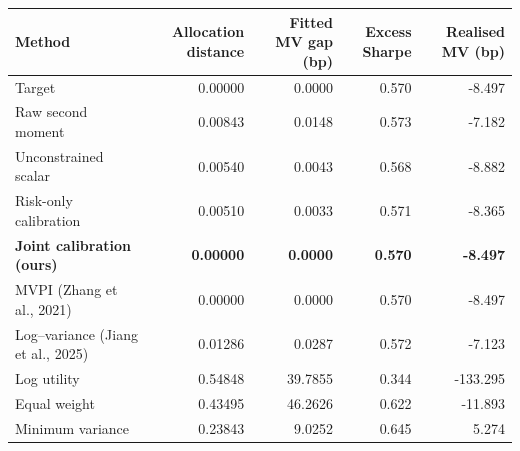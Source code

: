 \begin{tabular}{lrrrr}\toprule
Method & Allocation distance & Fitted MV gap (bp) & Excess Sharpe & Realised MV (bp)\\\midrule
Target & 0.00000 & 0.0000 & 0.570 & -8.497 \\
Raw second moment & 0.00843 & 0.0148 & 0.573 & -7.182 \\
Unconstrained scalar & 0.00540 & 0.0043 & 0.568 & -8.882 \\
Risk-only calibration & 0.00510 & 0.0033 & 0.571 & -8.365 \\
\textbf{Joint calibration (ours)} & \textbf{0.00000} & \textbf{0.0000} & \textbf{0.570} & \textbf{-8.497} \\
MVPI (Zhang et al., 2021)~\cite{zhang2021} & 0.00000 & 0.0000 & 0.570 & -8.497 \\
Log--variance (Jiang et al., 2025)~\cite{jiang2025} & 0.01286 & 0.0287 & 0.572 & -7.123 \\
Log utility & 0.54848 & 39.7855 & 0.344 & -133.295 \\
Equal weight & 0.43495 & 46.2626 & 0.622 & -11.893 \\
Minimum variance & 0.23843 & 9.0252 & 0.645 & 5.274 \\
\bottomrule\end{tabular}
